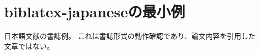 \documentclass{ltjsarticle}
\begin{document}
\section*{biblatex-japaneseの最小例}
日本語文献の書誌例\autocite[57]{tamaoka2011}。
これは書誌形式の動作確認であり、論文内容を引用した文章ではない。
\nocite{yu2020}
\printbibliography
\end{document}
